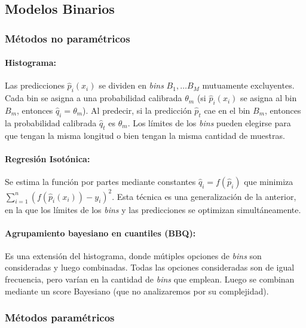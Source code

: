\subsection{Modelos Binarios}

\subsubsection{Métodos no paramétricos}

\paragraph{Histograma:}

Las predicciones $\hat p_{i}(x_i)$ se dividen en {\it bins\/} $B_1, \dots B_M$
mutuamente excluyentes. Cada bin se asigna a una probabilidad calibrada
$\theta_m$ (si $\hat p_{i}(x_i)$ se asigna al bin $B_m$, entonces $\hat
q_i=\theta_m$). Al predecir, si la predicción $\hat p_t$ cae en el bin $B_m$,
entonces la probabilidad calibrada $\hat q_t$ es $\theta_m$. Los límites de los
{\it bins\/} pueden elegirse para que tengan la misma longitud o bien tengan la
misma cantidad de muestras.

\paragraph{Regresión Isotónica:}

Se estima la función por partes mediante constantes $\hat q_i=f(\hat p_i)$ que
minimiza $\sum _{i=1}^{n}(f(\hat p_{i}(x_i))-y_i)^2$. Esta técnica es una
generalización de la anterior, en la que los límites de los {\it bins\/} y las
predicciones se optimizan simultáneamente.

\paragraph{Agrupamiento bayesiano en cuantiles (BBQ):}

Es una extensión del histograma, donde mútiples opciones de {\it bins\/} son
consideradas y luego combinadas. Todas las opciones consideradas son de igual
frecuencia, pero varían en la cantidad de {\it bins\/} que emplean. Luego se
combinan mediante un score Bayesiano (que no analizaremos por su complejidad).

\subsubsection{Métodos paramétricos}

